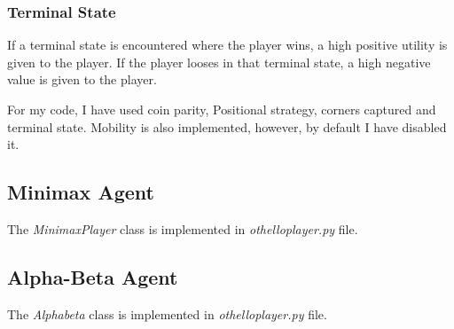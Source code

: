 \subsubsection*{Terminal State}
If a terminal state is encountered where the player wins, a high positive utility is given to the player. If the player looses in that terminal state, a high negative value is given to the player.

For my code, I have used coin parity, Positional strategy, corners captured and terminal state. Mobility is also implemented, however, by default I have disabled it.
\subsection*{Minimax Agent}
The \textit{MinimaxPlayer} class is implemented in \textit{othelloplayer.py} file.
\subsection*{Alpha-Beta Agent}
The \textit{Alphabeta} class is implemented in \textit{othelloplayer.py} file.